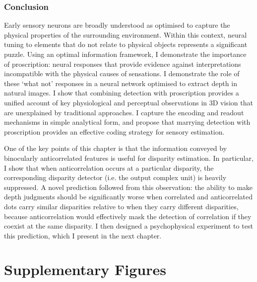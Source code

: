 \subsubsection*{Conclusion}

Early sensory neurons are broadly understood as optimised to capture the physical properties of the surrounding environment. Within this context, neural tuning to elements that do not relate to physical objects represents a significant puzzle. Using an optimal information framework, I demonstrate the importance of proscription: neural responses that provide evidence against interpretations incompatible with the physical causes of sensations. I demonstrate the role of these `what not' responses in a neural network optimised to extract depth in natural images. I show that combining detection with proscription provides a unified account of key physiological and perceptual observations in 3D vision that are unexplained by traditional approaches. I capture the encoding and readout mechanisms in simple analytical form, and propose that marrying detection with proscription provides an effective coding strategy for sensory estimation.

One of the key points of this chapter is that the information conveyed by binocularly anticorrelated features is useful for disparity estimation. In particular, I show that when anticorrelation occurs at a particular disparity, the corresponding disparity detector (i.e. the output complex unit) is heavily suppressed. A novel prediction followed from this observation: the ability to make depth judgments should be significantly worse when correlated and anticorrelated dots carry similar disparities relative to when they carry different disparities, because anticorrelation would effectively mask the detection of correlation if they coexist at the same disparity. I then designed a psychophysical experiment to test this prediction, which I present in the next chapter.

\clearpage

\section{Supplementary Figures}

